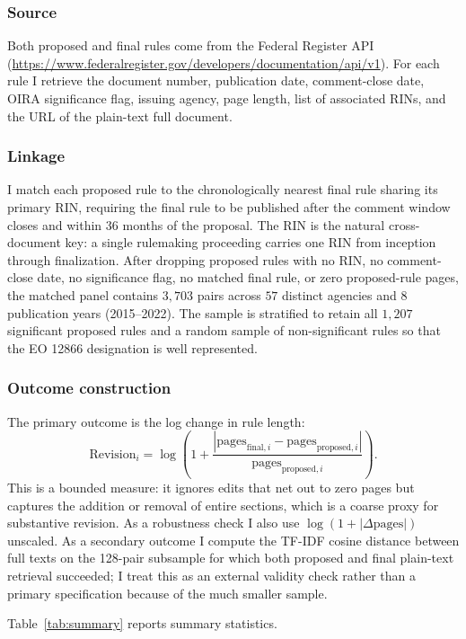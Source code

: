\documentclass[12pt]{article}
\begin{document}
\subsubsection*{Source} Both proposed and final rules come from the Federal Register API (\url{https://www.federalregister.gov/developers/documentation/api/v1}). For each rule I retrieve the document number, publication date, comment-close date, OIRA significance flag, issuing agency, page length, list of associated RINs, and the URL of the plain-text full document.

\subsubsection*{Linkage} I match each proposed rule to the chronologically nearest final rule sharing its primary RIN, requiring the final rule to be published after the comment window closes and within 36 months of the proposal. The RIN is the natural cross-document key: a single rulemaking proceeding carries one RIN from inception through finalization. After dropping proposed rules with no RIN, no comment-close date, no significance flag, no matched final rule, or zero proposed-rule pages, the matched panel contains $3{,}703$ pairs across $57$ distinct agencies and $8$ publication years (2015--2022). The sample is stratified to retain all $1{,}207$ significant proposed rules and a random sample of non-significant rules so that the EO 12866 designation is well represented.

\subsubsection*{Outcome construction} The primary outcome is the log change in rule length:
$$\text{Revision}_i = \log\!\left(1+\frac{|\text{pages}_{\text{final},i}-\text{pages}_{\text{proposed},i}|}{\text{pages}_{\text{proposed},i}}\right).$$
This is a bounded measure: it ignores edits that net out to zero pages but captures the addition or removal of entire sections, which is a coarse proxy for substantive revision. As a robustness check I also use $\log(1+|\Delta\text{pages}|)$ unscaled. As a secondary outcome I compute the TF-IDF cosine distance between full texts on the 128-pair subsample for which both proposed and final plain-text retrieval succeeded; I treat this as an external validity check rather than a primary specification because of the much smaller sample.

Table~\ref{tab:summary} reports summary statistics.
\end{document}

